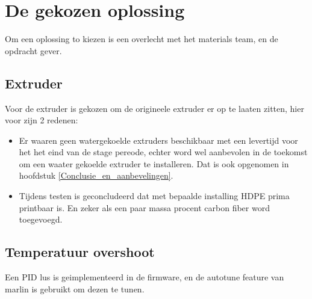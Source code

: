 \chapter{De gekozen oplossing}
\label{De_gekozen_oplossing}

Om een oplossing to kiezen is een overlecht met het materials team, en de
opdracht gever.

\section{Extruder}

Voor de extruder is gekozen om de origineele extruder er op te laaten zitten,
hier voor zijn 2 redenen:

\begin{itemize}
    \item Er waaren geen watergekoelde extruders beschikbaar met een levertijd
    voor het het eind van de stage pereode, echter word wel aanbevolen in de
    toekomst om een waater gekoelde extruder te installeren. Dat is ook
    opgenomen in hoofdstuk \ref{Conclusie_en_aanbevelingen}.
    \item Tijdens testen is geconcludeerd dat met bepaalde installing HDPE
    prima printbaar is. En zeker als een paar massa procent carbon fiber word
    toegevoegd.
\end{itemize}

\section{Temperatuur overshoot}

Een PID lus is geimplementeerd in de firmware, en de autotune feature van
marlin is gebruikt om dezen te tunen.


